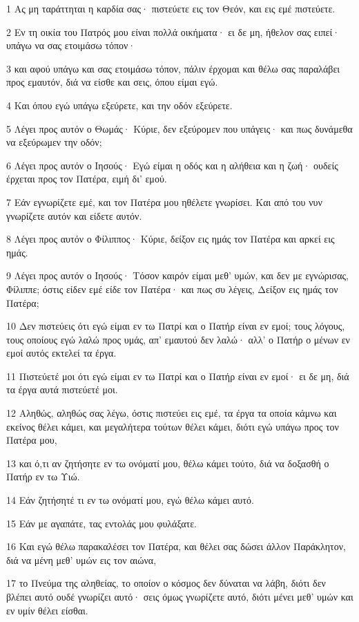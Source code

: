 \par 1 Ας μη ταράττηται η καρδία σας· πιστεύετε εις τον Θεόν, και εις εμέ πιστεύετε.
\par 2 Εν τη οικία του Πατρός μου είναι πολλά οικήματα· ει δε μη, ήθελον σας ειπεί· υπάγω να σας ετοιμάσω τόπον·
\par 3 και αφού υπάγω και σας ετοιμάσω τόπον, πάλιν έρχομαι και θέλω σας παραλάβει προς εμαυτόν, διά να είσθε και σεις, όπου είμαι εγώ.
\par 4 Και όπου εγώ υπάγω εξεύρετε, και την οδόν εξεύρετε.
\par 5 Λέγει προς αυτόν ο Θωμάς· Κύριε, δεν εξεύρομεν που υπάγεις· και πως δυνάμεθα να εξεύρωμεν την οδόν;
\par 6 Λέγει προς αυτόν ο Ιησούς· Εγώ είμαι η οδός και η αλήθεια και η ζωή· ουδείς έρχεται προς τον Πατέρα, ειμή δι' εμού.
\par 7 Εάν εγνωρίζετε εμέ, και τον Πατέρα μου ηθέλετε γνωρίσει. Και από του νυν γνωρίζετε αυτόν και είδετε αυτόν.
\par 8 Λέγει προς αυτόν ο Φίλιππος· Κύριε, δείξον εις ημάς τον Πατέρα και αρκεί εις ημάς.
\par 9 Λέγει προς αυτόν ο Ιησούς· Τόσον καιρόν είμαι μεθ' υμών, και δεν με εγνώρισας, Φίλιππε; όστις είδεν εμέ είδε τον Πατέρα· και πως συ λέγεις, Δείξον εις ημάς τον Πατέρα;
\par 10 Δεν πιστεύεις ότι εγώ είμαι εν τω Πατρί και ο Πατήρ είναι εν εμοί; τους λόγους, τους οποίους εγώ λαλώ προς υμάς, απ' εμαυτού δεν λαλώ· αλλ' ο Πατήρ ο μένων εν εμοί αυτός εκτελεί τα έργα.
\par 11 Πιστεύετέ μοι ότι εγώ είμαι εν τω Πατρί και ο Πατήρ είναι εν εμοί· ει δε μη, διά τα έργα αυτά πιστεύετέ μοι.
\par 12 Αληθώς, αληθώς σας λέγω, όστις πιστεύει εις εμέ, τα έργα τα οποία κάμνω και εκείνος θέλει κάμει, και μεγαλήτερα τούτων θέλει κάμει, διότι εγώ υπάγω προς τον Πατέρα μου,
\par 13 και ό,τι αν ζητήσητε εν τω ονόματί μου, θέλω κάμει τούτο, διά να δοξασθή ο Πατήρ εν τω Υιώ.
\par 14 Εάν ζητήσητέ τι εν τω ονόματί μου, εγώ θέλω κάμει αυτό.
\par 15 Εάν με αγαπάτε, τας εντολάς μου φυλάξατε.
\par 16 Και εγώ θέλω παρακαλέσει τον Πατέρα, και θέλει σας δώσει άλλον Παράκλητον, διά να μένη μεθ' υμών εις τον αιώνα,
\par 17 το Πνεύμα της αληθείας, το οποίον ο κόσμος δεν δύναται να λάβη, διότι δεν βλέπει αυτό ουδέ γνωρίζει αυτό· σεις όμως γνωρίζετε αυτό, διότι μένει μεθ' υμών και εν υμίν θέλει είσθαι.
